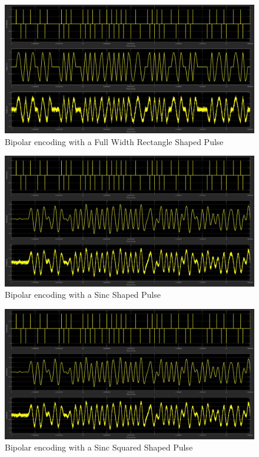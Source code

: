 \documentclass{article}
\begin{document}
\begin{figure}[H]
  \includegraphics[width = \linewidth]{BP_Sin.jpg}
  \caption{Bipolar encoding with a Full Width Rectangle Shaped Pulse}
  \label{fig:BP-Sin}
\end{figure}
\begin{figure}[H]
  \includegraphics[width = \linewidth]{BP_Sinc.jpg}
  \caption{Bipolar encoding with a Sinc Shaped Pulse}
  \label{fig:BP-Sinc}
\end{figure}
\begin{figure}[H]
  \includegraphics[width = \linewidth]{BP_Squared.jpg}
  \caption{Bipolar encoding with a Sinc Squared Shaped Pulse}
  \label{fig:BP-Squared}
\end{figure}
\end{document}
